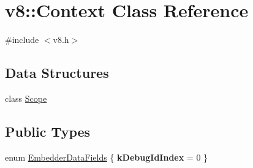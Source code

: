 \hypertarget{classv8_1_1Context}{}\section{v8\+:\+:Context Class Reference}
\label{classv8_1_1Context}


{\ttfamily \#include $<$v8.\+h$>$}

\subsection*{Data Structures}
\begin{DoxyCompactItemize}
\item 
class \hyperlink{classv8_1_1Context_1_1Scope}{Scope}
\end{DoxyCompactItemize}
\subsection*{Public Types}
\begin{DoxyCompactItemize}
\item 
enum \hyperlink{classv8_1_1Context_a8e8a8c567e2d193f25f1ec211db0b5f9}{Embedder\+Data\+Fields} \{ {\bfseries k\+Debug\+Id\+Index} = 0
 \}
\end{DoxyCompactItemize}
